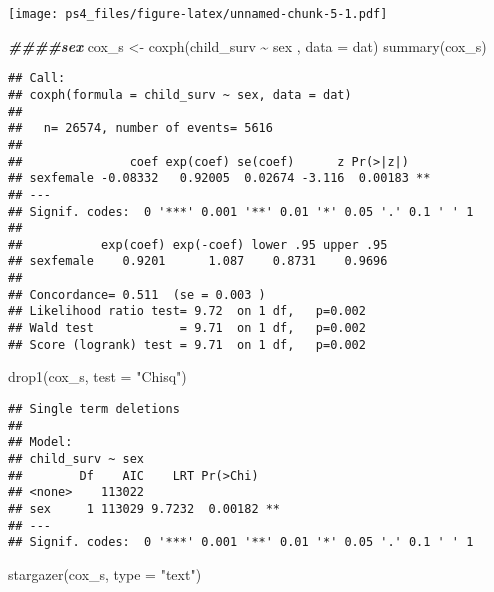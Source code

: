 \documentclass[
]{article}
\newenvironment{Shaded}{\begin{snugshade}}{\end{snugshade}}
\newcommand{\AttributeTok}[1]{\textcolor[rgb]{0.77,0.63,0.00}{#1}}
\newcommand{\DocumentationTok}[1]{\textcolor[rgb]{0.56,0.35,0.01}{\textbf{\textit{#1}}}}
\newcommand{\FunctionTok}[1]{\textcolor[rgb]{0.00,0.00,0.00}{#1}}
\newcommand{\NormalTok}[1]{#1}
\newcommand{\OtherTok}[1]{\textcolor[rgb]{0.56,0.35,0.01}{#1}}
\newcommand{\SpecialCharTok}[1]{\textcolor[rgb]{0.00,0.00,0.00}{#1}}
\newcommand{\StringTok}[1]{\textcolor[rgb]{0.31,0.60,0.02}{#1}}
\begin{document}
\texttt{[image: ps4\_files/figure-latex/unnamed-chunk-5-1.pdf]}

\begin{Shaded}
\begin{Highlighting}[]
\DocumentationTok{\#\#\#\#sex}
\NormalTok{cox\_s }\OtherTok{\textless{}{-}} \FunctionTok{coxph}\NormalTok{(child\_surv }\SpecialCharTok{\textasciitilde{}}\NormalTok{ sex , }\AttributeTok{data =}\NormalTok{ dat)}
\FunctionTok{summary}\NormalTok{(cox\_s)}
\end{Highlighting}
\end{Shaded}

\begin{verbatim}
## Call:
## coxph(formula = child_surv ~ sex, data = dat)
## 
##   n= 26574, number of events= 5616 
## 
##               coef exp(coef) se(coef)      z Pr(>|z|)   
## sexfemale -0.08332   0.92005  0.02674 -3.116  0.00183 **
## ---
## Signif. codes:  0 '***' 0.001 '**' 0.01 '*' 0.05 '.' 0.1 ' ' 1
## 
##           exp(coef) exp(-coef) lower .95 upper .95
## sexfemale    0.9201      1.087    0.8731    0.9696
## 
## Concordance= 0.511  (se = 0.003 )
## Likelihood ratio test= 9.72  on 1 df,   p=0.002
## Wald test            = 9.71  on 1 df,   p=0.002
## Score (logrank) test = 9.71  on 1 df,   p=0.002
\end{verbatim}

\begin{Shaded}
\begin{Highlighting}[]
\FunctionTok{drop1}\NormalTok{(cox\_s, }\AttributeTok{test =} \StringTok{"Chisq"}\NormalTok{)}
\end{Highlighting}
\end{Shaded}

\begin{verbatim}
## Single term deletions
## 
## Model:
## child_surv ~ sex
##        Df    AIC    LRT Pr(>Chi)   
## <none>    113022                   
## sex     1 113029 9.7232  0.00182 **
## ---
## Signif. codes:  0 '***' 0.001 '**' 0.01 '*' 0.05 '.' 0.1 ' ' 1
\end{verbatim}

\begin{Shaded}
\begin{Highlighting}[]
\FunctionTok{stargazer}\NormalTok{(cox\_s, }\AttributeTok{type =} \StringTok{"text"}\NormalTok{)}
\end{Highlighting}
\end{Shaded}
\end{document}
